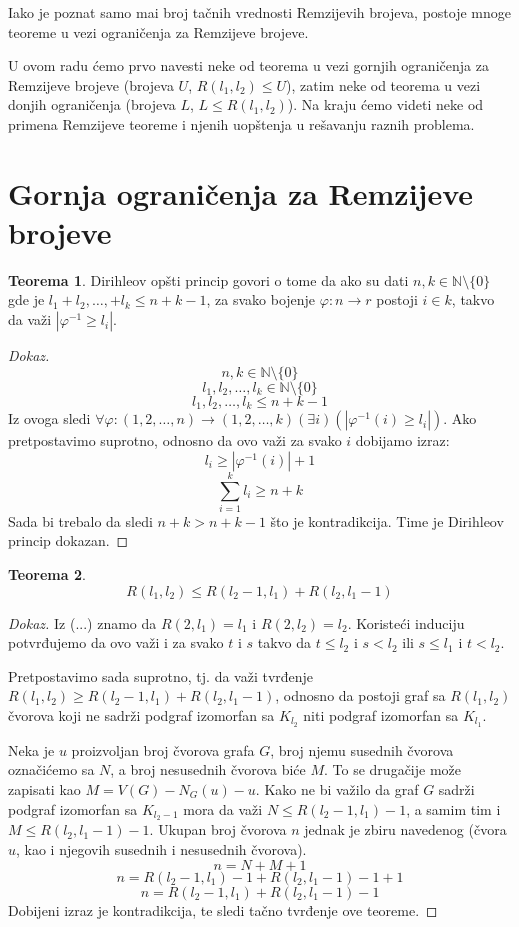 \documentclass{article}
\theoremstyle{definition}
\newtheorem{teorema}{Teorema}[section]
\newcommand{\dokaz}[1]{\begin{proof}[Dokaz]#1\end{proof}}
\begin{document}
	
	Iako je poznat samo mai broj tačnih vrednosti Remzijevih brojeva, postoje mnoge teoreme u vezi ograničenja za Remzijeve brojeve. 
	
	U ovom radu ćemo prvo navesti neke od teorema u vezi gornjih ograničenja za Remzijeve brojeve (brojeva $U$, $R(l_1,l_2)\leq U$), zatim neke od teorema u vezi donjih ograničenja (brojeva $L$, $L \leq R(l_1,l_2)$). Na kraju ćemo videti neke od primena Remzijeve teoreme i njenih uopštenja u rešavanju raznih problema.
	
	
	
	\newpage
	\section{Gornja ograničenja za Remzijeve brojeve}
	
	\begin{teorema}
		Dirihleov opšti princip govori o tome da ako su dati $n,k \in \mathbb{N} \setminus \{0\}$ gde je $l_1+ l_2, \ldots , + l_k \leq n+k-1$, za svako bojenje $\varphi : n \rightarrow r$ postoji $i \in k$, takvo da važi $|\varphi^{-1} \geq l_i|$.
	\end{teorema}
	\dokaz{
		\[
		n,k \in \mathbb{N} \setminus \{0\}
		\]
		\[
		l_1, l_2,\ldots , l_k \in \mathbb{N} \setminus \{0\}
		\]
		\[
		l_1, l_2, \ldots , l_k \leq n+k-1
		\]
		Iz ovoga sledi $ \forall \varphi : (1,2,\ldots,n) \rightarrow (1,2,\ldots, k)(\exists i)(| \varphi^{-1}(i) \geq l_i|) $. Ako pretpostavimo suprotno, odnosno da ovo važi za svako $i$ dobijamo izraz:
		\[
		l_i \geq |\varphi^{-1}(i)|+1
		\]
		\[
		\sum\limits_{i=1}^{k} l_i \geq n+k
		\]
		Sada bi trebalo da sledi $n+k > n+k-1$ što je kontradikcija. Time je Dirihleov princip dokazan.
	}
	
	
	
	\begin{teorema}
		\[
		R(l_1,l_2) \leq R(l_2-1, l_1) + R(l_2, l_1-1)
		\]
	\end{teorema}
	\dokaz{
		Iz (...) znamo da $R(2,l_1)=l_1$ i $R(2,l_2)=l_2$. Koristeći induciju potvrđujemo da ovo važi i za svako $t$ i $s$ takvo da $t\leq l_2$ i $s<l_2$ ili $s\leq l_1$ i $t<l_2$.
		
		Pretpostavimo sada suprotno, tj. da važi tvrđenje $R(l_1,l_2) \geq R(l_2-1, l_1) + R(l_2, l_1-1)$, odnosno da postoji graf sa $R(l_1,l_2)$ čvorova koji ne sadrži podgraf izomorfan sa $K_{l_2}$ niti podgraf izomorfan sa $K_{l_1}$.
		
		
		Neka je $u$ proizvoljan broj čvorova grafa $G$, broj njemu susednih čvorova označićemo sa $N$, a broj nesusednih čvorova biće $M$.
		To se drugačije može zapisati kao $M=V(G)-N_G(u)-{u}$.
		Kako ne bi važilo da graf $G$ sadrži podgraf izomorfan sa $K_{l_2-1}$  mora da važi $N\leq R(l_2-1, l_1)-1 $, a samim tim i $M \leq R(l_2, l_1-1)-1 $. 
		Ukupan broj čvorova $n$ jednak je zbiru navedenog (čvora $u$, kao i njegovih susednih i nesusednih čvorova).
		\[
		n= N+M+1
		\]
		\[
		n= R(l_2-1, l_1)-1 + R(l_2, l_1-1)-1+1
		\]
		\[
		n= R(l_2-1, l_1)+ R(l_2, l_1-1)-1
		\]
		Dobijeni izraz je kontradikcija, te sledi tačno tvrđenje ove teoreme.
	}
	
\end{document}
